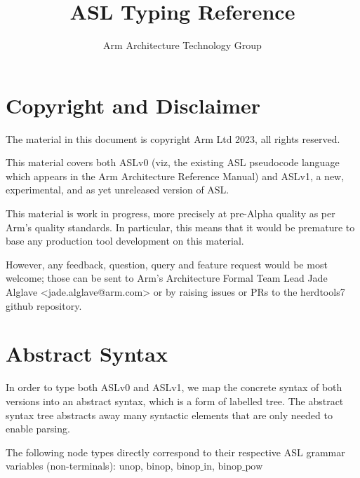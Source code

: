 \documentclass{book}
\author{Arm Architecture Technology Group}
\title{ASL Typing Reference}
\begin{document}
\maketitle
\tableofcontents{}

\chapter{Copyright and Disclaimer}

The material in this document is copyright Arm Ltd 2023, all rights reserved.

This material covers both ASLv0 (viz, the existing ASL pseudocode language
which appears in the Arm Architecture Reference Manual) and ASLv1, a new,
experimental, and as yet unreleased version of ASL.

This material is work in progress, more precisely at pre-Alpha quality as
per Arm’s quality standards. In particular, this means that it would be
premature to base any production tool development on this material.

However, any feedback, question, query and feature request would be most
welcome; those can be sent to Arm’s Architecture Formal Team Lead Jade
Alglave <jade.alglave@arm.com> or by raising issues or PRs to the herdtools7
github repository.

\chapter{Abstract Syntax}
In order to type both ASLv0 and ASLv1, we map the concrete syntax of both versions into an abstract syntax, which is a form of labelled tree. The abstract syntax tree abstracts away many syntactic elements that are only needed to enable parsing.

\newcommand\BNOT[0]{\texttt{"!"}}
\newcommand\NEG[0]{\texttt{"-"}}
\newcommand\NOT[0]{\texttt{"NOT"}}

\newcommand\unop[0]{\textrm{unop}}
\newcommand\binop[0]{\textrm{binop}}
\newcommand\binopin[0]{\textrm{binop\_in}}
\newcommand\binoppow[0]{\textrm{binop\_pow}}

\newcommand\literal[0]{\texttt{literal}}
\newcommand\expr[0]{\texttt{expr}}

The following node types directly correspond to their respective ASL grammar variables (non-terminals):  $\unop$, $\binop$, $\binopin$, $\binoppow$
\end{document}
